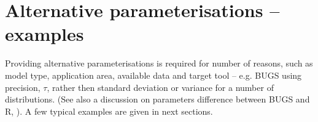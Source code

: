 {%
%
%

\section{Alternative parameterisations -- examples}
Providing alternative parameterisations is required for number of reasons, such as
model type, application area, available data and target tool -- e.g. BUGS using 
precision, $\tau$, rather then standard deviation or variance for a number of 
distributions. (See also a discussion on parameters difference between BUGS
and R, \cite{lebauer2013translating}). A few typical examples are given in next sections.

}
